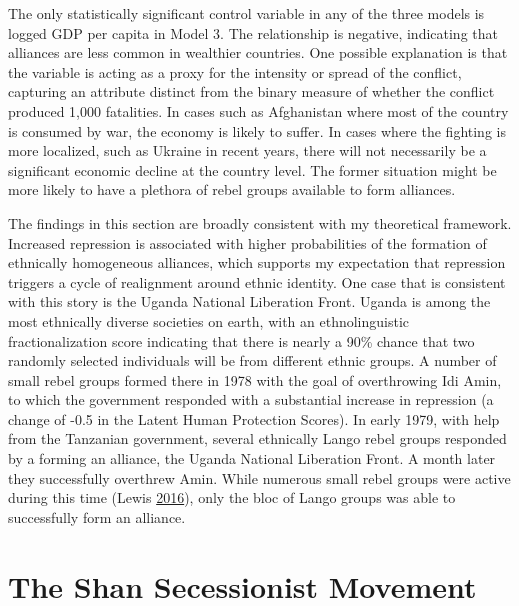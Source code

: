 \documentclass[12pt,]{book}
\theoremstyle{definition}
\theoremstyle{definition}
\theoremstyle{remark}
\begin{document}
The only statistically significant control variable in any of the three
models is logged GDP per capita in Model 3. The relationship is
negative, indicating that alliances are less common in wealthier
countries. One possible explanation is that the variable is acting as a
proxy for the intensity or spread of the conflict, capturing an
attribute distinct from the binary measure of whether the conflict
produced 1,000 fatalities. In cases such as Afghanistan where most of
the country is consumed by war, the economy is likely to suffer. In
cases where the fighting is more localized, such as Ukraine in recent
years, there will not necessarily be a significant economic decline at
the country level. The former situation might be more likely to have a
plethora of rebel groups available to form alliances.

The findings in this section are broadly consistent with my theoretical
framework. Increased repression is associated with higher probabilities
of the formation of ethnically homogeneous alliances, which supports my
expectation that repression triggers a cycle of realignment around
ethnic identity. One case that is consistent with this story is the
Uganda National Liberation Front. Uganda is among the most ethnically
diverse societies on earth, with an ethnolinguistic fractionalization
score indicating that there is nearly a 90\% chance that two randomly
selected individuals will be from different ethnic groups. A number of
small rebel groups formed there in 1978 with the goal of overthrowing
Idi Amin, to which the government responded with a substantial increase
in repression (a change of -0.5 in the Latent Human Protection Scores).
In early 1979, with help from the Tanzanian government, several
ethnically Lango rebel groups responded by a forming an alliance, the
Uganda National Liberation Front. A month later they successfully
overthrew Amin. While numerous small rebel groups were active during
this time (Lewis \protect\hyperlink{ref-Lewis2016}{2016}), only the bloc
of Lango groups was able to successfully form an alliance.

\section{The Shan Secessionist
Movement}\label{the-shan-secessionist-movement}
\end{document}

